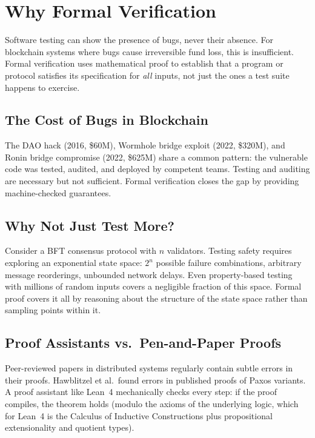 \section{Why Formal Verification}


Software testing can show the presence of bugs, never their absence. For blockchain systems
where bugs cause irreversible fund loss, this is insufficient. Formal verification uses
mathematical proof to establish that a program or protocol satisfies its specification for
\emph{all} inputs, not just the ones a test suite happens to exercise.

\subsection{The Cost of Bugs in Blockchain}

The DAO hack (2016, \$60M), Wormhole bridge exploit (2022, \$320M), and Ronin bridge
compromise (2022, \$625M) share a common pattern: the vulnerable code was tested, audited,
and deployed by competent teams. Testing and auditing are necessary but not sufficient.
Formal verification closes the gap by providing machine-checked guarantees.

\subsection{Why Not Just Test More?}

Consider a BFT consensus protocol with $n$ validators. Testing safety requires exploring
an exponential state space: $2^n$ possible failure combinations, arbitrary message
reorderings, unbounded network delays. Even property-based testing with millions of random
inputs covers a negligible fraction of this space. Formal proof covers it all by reasoning
about the structure of the state space rather than sampling points within it.

\subsection{Proof Assistants vs.\ Pen-and-Paper Proofs}

Peer-reviewed papers in distributed systems regularly contain subtle errors in their proofs.
Hawblitzel et al.\ found errors in published proofs of Paxos variants. A proof assistant
like Lean~4 mechanically checks every step: if the proof compiles, the theorem holds
(modulo the axioms of the underlying logic, which for Lean~4 is the Calculus of Inductive
Constructions plus propositional extensionality and quotient types).

